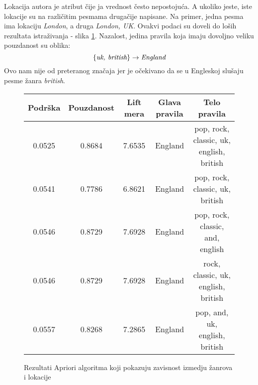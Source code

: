 Lokacija autora je atribut \v{c}ije ja vrednost \v{c}esto nepostoju\'c{}a. A ukoliko jeste, iste lokacije su na razli\v{c}itim pesmama druga\v{c}ije napisane. Na primer, jedna pesma ima lokaciju \emph{London}, a druga \emph{London, UK}. Ovakvi podaci su doveli do lo\v{s}ih rezultata istra\v{z}ivanja - slika \ref{fig:aprioriLocation}. Nazalost, jedina pravila koja imaju dovoljno veliku pouzdanost su oblika:
$$\{\emph{uk, british}\} \rightarrow \emph{England}$$
Ovo nam nije od preteranog zna\v{c}aja jer je o\v{c}ekivano da se u Engleskoj slu\v{s}aju pesme \v{z}anra \emph{british}.

\begin{figure}[H]
    \footnotesize
    \centering
    \begin{tabular}{|c|c|c|c|c|}
        \hline
        Podr\v{s}ka & Pouzdanost & Lift mera & Glava pravila & Telo pravila \\
        \hline
        0.0525 & 0.8684 & 7.6535 & England & pop, rock, classic, uk, english, british \\
        0.0541 & 0.7786 & 6.8621 & England & pop, rock, classic, uk, british \\
        0.0546 & 0.8729 & 7.6928 & England & pop, rock, classic, and, english \\
        0.0546 & 0.8729 & 7.6928 & England & rock, classic, uk, english, british \\
        0.0557 & 0.8268 & 7.2865 & England & pop, and, uk, english, british \\
        \hline
    \end{tabular}
    \caption{Rezultati Apriori algoritma koji pokazuju zavisnost izmedju \v{z}anrova i lokacije}
    \label{fig:aprioriLocation}
\end{figure}
